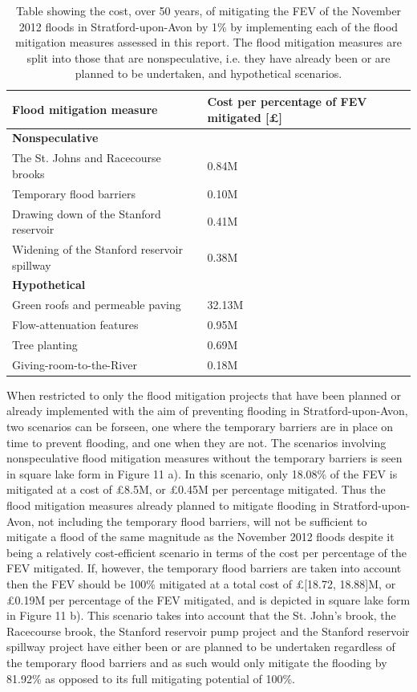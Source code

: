 \documentclass[11pt,a4paper]{article}
\begin{document}
\begin{table}[ht!]
\centering
\begin{tabular}{l|l}
Flood mitigation measure & Cost per percentage of FEV mitigated [\pounds]\\
\hline
\textbf{Nonspeculative} & \\
The St. Johns and Racecourse brooks & 0.84M\\
Temporary flood barriers & 0.10M\\
Drawing down of the Stanford reservoir & 0.41M\\
Widening of the Stanford reservoir spillway & 0.38M\\
\textbf{Hypothetical} & \\
Green roofs and permeable paving& 32.13M\\
Flow-attenuation features & 0.95M\\
Tree planting & 0.69M\\
Giving-room-to-the-River & 0.18M\\
\end{tabular}
\caption{Table showing the cost, over 50 years, of mitigating the FEV of the November 2012 floods in Stratford-upon-Avon by 1\% by implementing each of the flood mitigation measures assessed in this report. The flood mitigation measures are split into those that are nonspeculative, i.e. they have already been or are planned to be undertaken, and hypothetical scenarios.}
\end{table}

\noindent When restricted to only the flood mitigation projects that have been planned or already implemented with the aim of preventing flooding in Stratford-upon-Avon, two scenarios can be forseen, one where the temporary barriers are in place on time to prevent flooding, and one when they are not. The scenarios involving nonspeculative flood mitigation measures without the temporary barriers is seen in square lake form in Figure 11 a). In this scenario, only 18.08\% of the FEV is mitigated at a cost of \pounds8.5M, or \pounds0.45M per percentage mitigated. Thus the flood mitigation measures already planned to mitigate flooding in Stratford-upon-Avon, not including the temporary flood barriers, will not be sufficient to mitigate a flood of the same magnitude as the November 2012 floods despite it being a relatively cost-efficient scenario in terms of the cost per percentage of the FEV mitigated. If, however, the temporary flood barriers are taken into account then the FEV should be 100\% mitigated at a total cost of \pounds[18.72, 18.88]M, or \pounds0.19M per percentage of the FEV mitigated, and is depicted in square lake form in Figure 11 b). This scenario takes into account that the St. John's brook, the Racecourse brook, the Stanford reservoir pump project and the Stanford reservoir spillway project have either been or are planned to be undertaken regardless of the temporary flood barriers and as such would only mitigate the flooding by 81.92\% as opposed to its full mitigating potential of 100\%.
\end{document}
